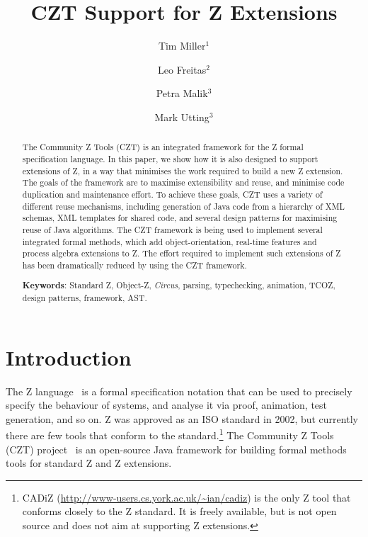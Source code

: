 \documentclass{llncs}
\newcommand{\Circus}{{\sf\slshape Circus}}
\begin{document}
\title{CZT Support for Z Extensions}
\author{Tim Miller$^1$ \and Leo Freitas$^2$ \and Petra Malik$^3$ \and Mark Utting$^3$}


\maketitle


\begin{abstract}
  The Community Z Tools (CZT) is an integrated
  framework for the Z formal specification language.  In this
  paper, we show how it is also designed to support extensions
  of Z, in a way that minimises the work required to build a
  new Z extension.  The goals of the framework are to maximise
  extensibility and reuse, and minimise code duplication and
  maintenance effort.  To achieve these goals, CZT uses a variety of
  different reuse mechanisms, including generation of Java
  code from a hierarchy of XML schemas, XML templates for shared
  code, and several design patterns for maximising reuse of Java
  algorithms.
  The CZT framework is being used to implement several integrated
  formal methods, which add object-orientation, real-time features
  and process algebra extensions to Z.  The effort required to
  implement such extensions of Z has been dramatically reduced
  by using the CZT framework.

  \noindent
  \textbf{Keywords}: Standard Z, Object-Z, \Circus, parsing,
     typechecking, animation, TCOZ, design patterns, framework, AST.
\end{abstract}

\section{Introduction} \label{sec:intro}

  The Z language~\cite{isoz} is a formal specification notation that
  can be used to precisely specify the behaviour of systems, and
  analyse it via proof, animation, test generation, and so on.
  Z was approved as an ISO standard in 2002, but currently there are few
  tools that conform to the standard.\footnote{CADiZ
  (\url{http://www-users.cs.york.ac.uk/~ian/cadiz}) is the only Z tool
  that conforms closely to the Z standard.  It is freely available,
  but is not open source and does not aim at supporting Z extensions.}
  The Community Z Tools (CZT) project~\cite{czt} is an open-source Java
  framework for building formal methods tools for standard Z and Z extensions.
\end{document}
